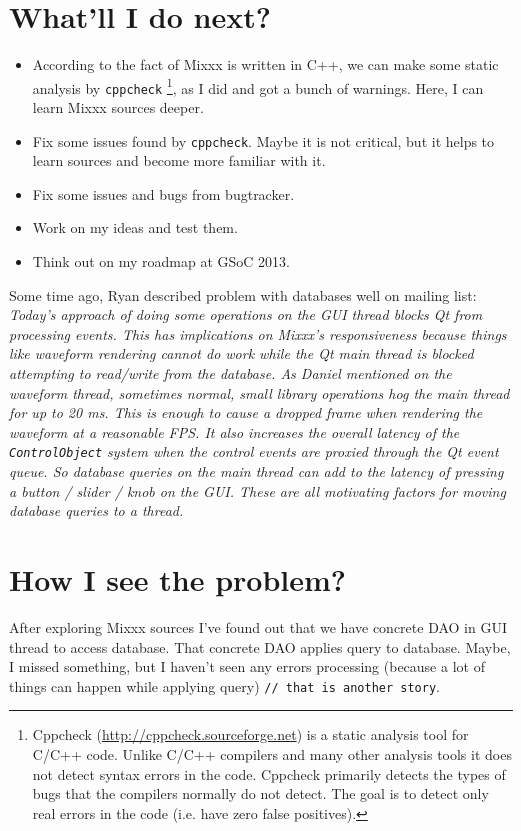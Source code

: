 \documentclass[a4paper,12pt]{scrartcl}
\begin{document}
\section{What'll I do next?}
\begin{itemize}
 \item According to the fact of Mixxx is written in C++, we can make some static analysis by \texttt{cppcheck}%
 \footnote{Cppcheck (\url{http://cppcheck.sourceforge.net}) is a static analysis tool for C/C++ code. Unlike C/C++ compilers and many other analysis tools it does not detect syntax errors in the code. Cppcheck primarily detects the types of bugs that the compilers normally do not detect. The goal is to detect only real errors in the code (i.e. have zero false positives).},
 as I did and got a bunch of warnings. Here, I can learn Mixxx sources deeper.
 \item Fix some issues found by \texttt{cppcheck}. Maybe it is not critical, but it helps to learn sources and become more familiar with it.
 \item Fix some issues and bugs from bugtracker.
 \item Work on my ideas and test them.
 \item Think out on my roadmap at GSoC 2013.
\end{itemize}

Some time ago, Ryan described problem with databases well on mailing list:
\textit{ Today's approach of doing some operations on the GUI thread blocks Qt from processing events. This has implications on Mixxx's responsiveness because things like waveform rendering cannot do work while the Qt main thread is blocked attempting to read/write from the database. As Daniel mentioned on the waveform thread, sometimes normal, small library operations hog the main thread for up to 20 ms. This is enough to cause a dropped frame when rendering the waveform at a reasonable FPS. It also increases the overall latency of the \texttt{ControlObject} system when the control events are proxied through the Qt event queue. So database queries on the main thread can add to the latency of pressing a button / slider / knob on the GUI. These are all motivating factors for moving database queries to a thread.}


\section{How I see the problem?}

After exploring Mixxx sources I've found out that we have concrete DAO in GUI thread to access database. That concrete DAO applies query to database. Maybe, I missed something, but I haven't seen any errors processing (because a lot of things can happen while applying query) \texttt{// that is another story}.
\end{document}
